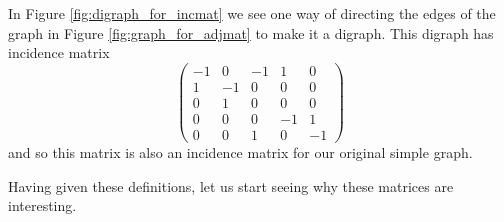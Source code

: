 \documentclass[nobib]{tufte-handout}
\begin{document}
\begin{example}
    In Figure \ref{fig:digraph_for_incmat} we see one way of directing the edges of the graph in Figure \ref{fig:graph_for_adjmat} to make it a digraph. This digraph has incidence matrix
    $$\begin{pmatrix}
        -1 & 0 & -1 & 1 & 0 \\
        1 & -1 & 0 & 0 & 0 \\
        0 & 1 & 0 & 0 & 0 \\
        0 & 0 & 0 & -1 & 1 \\
        0 & 0 & 1 & 0 & -1 
        \end{pmatrix}$$
    and so this matrix is also an incidence matrix for our original simple graph.
\end{example}

Having given these definitions, let us start seeing why these matrices are interesting.
\end{document}
